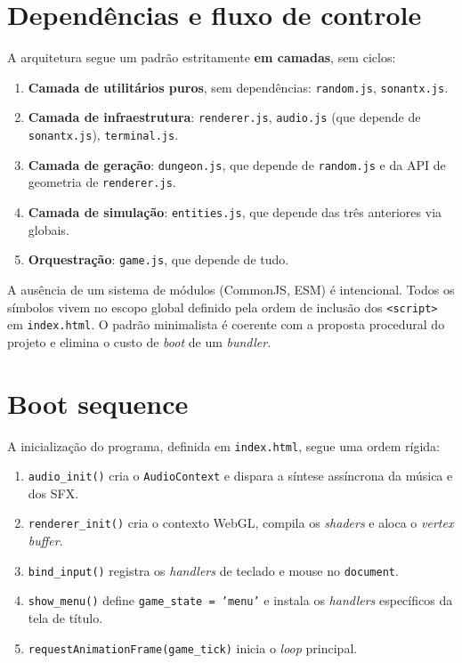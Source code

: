 \section{Dependências e fluxo de controle}

A arquitetura segue um padrão estritamente \textbf{em camadas}, sem ciclos:

\begin{enumerate}
  \item \textbf{Camada de utilitários puros}, sem dependências:
    \texttt{random.js}, \texttt{sonantx.js}.

  \item \textbf{Camada de infraestrutura}: \texttt{renderer.js}, \texttt{audio.js} (que
    depende de \texttt{sonantx.js}), \texttt{terminal.js}.

  \item \textbf{Camada de geração}: \texttt{dungeon.js}, que depende de
    \texttt{random.js} e da API de geometria de \texttt{renderer.js}.

  \item \textbf{Camada de simulação}: \texttt{entities.js}, que depende das três
    anteriores via globais.

  \item \textbf{Orquestração}: \texttt{game.js}, que depende de tudo.
\end{enumerate}

A ausência de um sistema de módulos (CommonJS, ESM) é intencional. Todos os símbolos
vivem no escopo global definido pela ordem de inclusão dos \texttt{<script>} em
\texttt{index.html}. O padrão minimalista é coerente com a proposta procedural do
projeto e elimina o custo de \emph{boot} de um \emph{bundler}.

\section{Boot sequence}

A inicialização do programa, definida em \texttt{index.html}, segue uma ordem rígida:

\begin{enumerate}
  \item \texttt{audio\_init()} cria o \texttt{AudioContext} e dispara a síntese
    assíncrona da música e dos SFX.
  \item \texttt{renderer\_init()} cria o contexto WebGL, compila os \emph{shaders} e
    aloca o \emph{vertex buffer}.
  \item \texttt{bind\_input()} registra os \emph{handlers} de teclado e mouse no
    \texttt{document}.
  \item \texttt{show\_menu()} define \texttt{game\_state = 'menu'} e instala os
    \emph{handlers} específicos da tela de título.
  \item \texttt{requestAnimationFrame(game\_tick)} inicia o \emph{loop} principal.
\end{enumerate}
